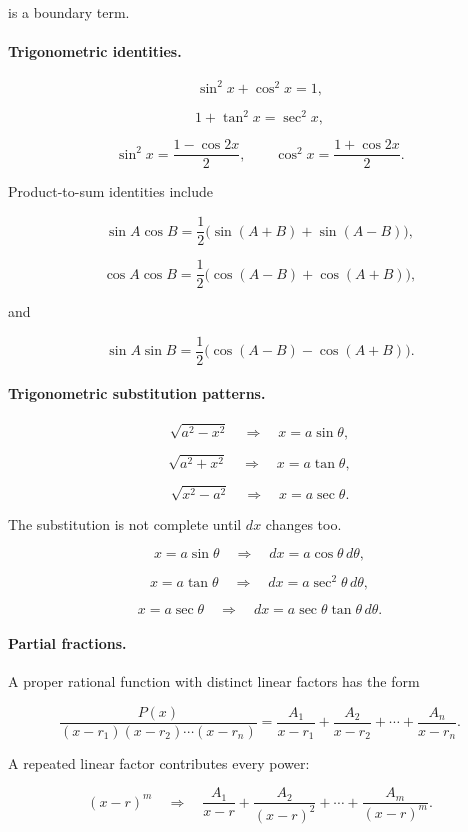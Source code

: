 is a boundary term.

\paragraph{Trigonometric identities.}

\[
\sin^2x+\cos^2x=1,
\]

\[
1+\tan^2x=\sec^2x,
\]

\[
\sin^2x=\frac{1-\cos2x}{2},
\qquad
\cos^2x=\frac{1+\cos2x}{2}.
\]

Product-to-sum identities include

\[
\sin A\cos B=\frac12\bigl(\sin(A+B)+\sin(A-B)\bigr),
\]

\[
\cos A\cos B=\frac12\bigl(\cos(A-B)+\cos(A+B)\bigr),
\]

and

\[
\sin A\sin B=\frac12\bigl(\cos(A-B)-\cos(A+B)\bigr).
\]

\paragraph{Trigonometric substitution patterns.}

\[
\sqrt{a^2-x^2}
\quad\Longrightarrow\quad
x=a\sin\theta,
\]

\[
\sqrt{a^2+x^2}
\quad\Longrightarrow\quad
x=a\tan\theta,
\]

\[
\sqrt{x^2-a^2}
\quad\Longrightarrow\quad
x=a\sec\theta.
\]

The substitution is not complete until \(dx\) changes too.

\[
x=a\sin\theta
\quad\Longrightarrow\quad
dx=a\cos\theta\,d\theta,
\]

\[
x=a\tan\theta
\quad\Longrightarrow\quad
dx=a\sec^2\theta\,d\theta,
\]

\[
x=a\sec\theta
\quad\Longrightarrow\quad
dx=a\sec\theta\tan\theta\,d\theta.
\]

\paragraph{Partial fractions.}

A proper rational function with distinct linear factors has the form

\[
\frac{P(x)}{(x-r_1)(x-r_2)\cdots(x-r_n)}
=
\frac{A_1}{x-r_1}
+
\frac{A_2}{x-r_2}
+\cdots+
\frac{A_n}{x-r_n}.
\]

A repeated linear factor contributes every power:

\[
(x-r)^m
\quad\Longrightarrow\quad
\frac{A_1}{x-r}
+
\frac{A_2}{(x-r)^2}
+\cdots+
\frac{A_m}{(x-r)^m}.
\]

